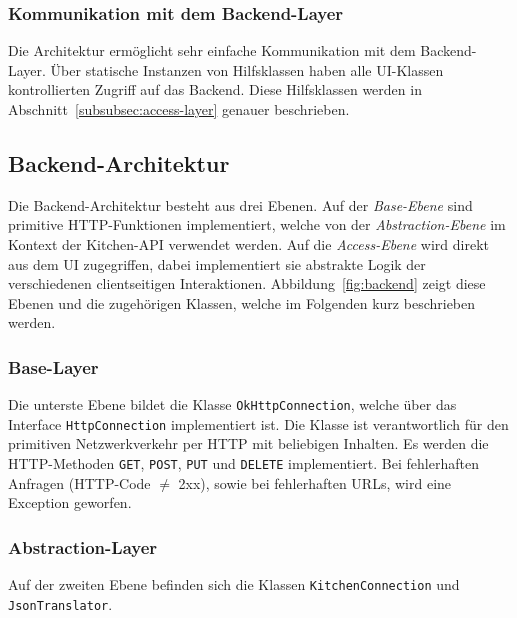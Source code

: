 \subsubsection{Kommunikation mit dem Backend-Layer}

Die Architektur ermöglicht sehr einfache Kommunikation mit dem Backend-Layer.
Über statische Instanzen von Hilfsklassen haben alle UI-Klassen kontrollierten Zugriff auf das Backend.
Diese Hilfsklassen werden in Abschnitt~\ref{subsubsec:access-layer} genauer beschrieben.

\subsection{Backend-Architektur}\label{subsec:backend}

Die Backend-Architektur besteht aus drei Ebenen.
Auf der \emph{Base-Ebene} sind primitive HTTP-Funktionen implementiert,
welche von der \emph{Abstraction-Ebene} im Kontext der Kitchen-API verwendet werden.
Auf die \emph{Access-Ebene} wird direkt aus dem UI zugegriffen, dabei implementiert sie abstrakte Logik der verschiedenen clientseitigen Interaktionen.
Abbildung~\ref{fig:backend} zeigt diese Ebenen und die zugehörigen Klassen, welche im Folgenden kurz beschrieben werden.


\subsubsection{Base-Layer}

Die unterste Ebene bildet die Klasse \texttt{OkHttpConnection}, welche über das Interface \texttt{HttpConnection} implementiert ist.
Die Klasse ist verantwortlich für den primitiven Netzwerkverkehr per HTTP mit beliebigen Inhalten.
Es werden die HTTP-Methoden \texttt{GET}, \texttt{POST}, \texttt{PUT} und \texttt{DELETE} implementiert.
Bei fehlerhaften Anfragen (HTTP-Code $\neq$ 2xx), sowie bei fehlerhaften URLs, wird eine Exception geworfen.

\subsubsection{Abstraction-Layer}

Auf der zweiten Ebene befinden sich die Klassen \texttt{KitchenConnection} und \texttt{JsonTranslator}.

